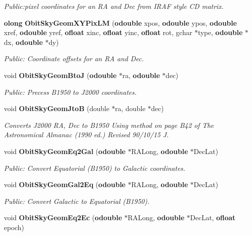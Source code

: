 \begin{CompactItemize}
\begin{CompactList}\small\item\em Public:pixel coordinates for an RA and Dec from IRAF style CD matrix. \item\end{CompactList}\item 
{\bf olong} {\bf Obit\-Sky\-Geom\-XYPix\-LM} ({\bf odouble} xpos, {\bf odouble} ypos, {\bf odouble} xref, {\bf odouble} yref, {\bf ofloat} xinc, {\bf ofloat} yinc, {\bf ofloat} rot, gchar $\ast$type, {\bf odouble} $\ast$dx, {\bf odouble} $\ast$dy)
\begin{CompactList}\small\item\em Public: Coordinate offsets for an RA and Dec. \item\end{CompactList}\item 
void {\bf Obit\-Sky\-Geom\-Bto\-J} ({\bf odouble} $\ast$ra, {\bf odouble} $\ast$dec)
\begin{CompactList}\small\item\em Public: Precess B1950 to J2000 coordinates. \item\end{CompactList}\item 
void {\bf Obit\-Sky\-Geom\-Jto\-B} (double $\ast$ra, double $\ast$dec)
\begin{CompactList}\small\item\em Converts J2000 RA, Dec to B1950 Using method on page B42 of The Astronomical Almanac (1990 ed.) Revised 90/10/15 J. \item\end{CompactList}\item 
void {\bf Obit\-Sky\-Geom\-Eq2Gal} ({\bf odouble} $\ast$RALong, {\bf odouble} $\ast$Dec\-Lat)
\begin{CompactList}\small\item\em Public: Convert Equatorial (B1950) to Galactic coordinates. \item\end{CompactList}\item 
void {\bf Obit\-Sky\-Geom\-Gal2Eq} ({\bf odouble} $\ast$RALong, {\bf odouble} $\ast$Dec\-Lat)
\begin{CompactList}\small\item\em Public: Convert Galactic to Equatorial (B1950). \item\end{CompactList}\item 
void {\bf Obit\-Sky\-Geom\-Eq2Ec} ({\bf odouble} $\ast$RALong, {\bf odouble} $\ast$Dec\-Lat, {\bf ofloat} epoch)

\end{CompactItemize}

